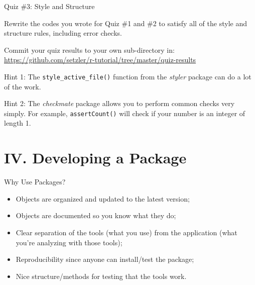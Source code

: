 \documentclass[10pt,ignorenonframetext,]{beamer}
\begin{document}
\begin{frame}[fragile]{Quiz \#3: Style and Structure}

Rewrite the codes you wrote for Quiz \#1 and \#2 to satisfy all of the
style and structure rules, including error checks.

Commit your quiz results to your own sub-directory in:
\url{https://github.com/setzler/r-tutorial/tree/master/quiz-results}

Hint 1: The \texttt{style\_active\_file()} function from the
\emph{styler} package can do a lot of the work.

Hint 2: The \emph{checkmate} package allows you to perform common checks
very simply. For example, \texttt{assertCount()} will check if your
number is an integer of length 1.

\end{frame}

\section{IV. Developing a Package}\label{iv.-developing-a-package}

\begin{frame}{Why Use Packages?}

\begin{itemize}
\item
  Objects are organized and updated to the latest version;
\item
  Objects are documented so you know what they do;
\item
  Clear separation of the tools (what you use) from the application
  (what you're analyzing with those tools);
\item
  Reproducibility since anyone can install/test the package;
\item
  Nice structure/methods for testing that the tools work.
\end{itemize}

\end{frame}
\end{document}
